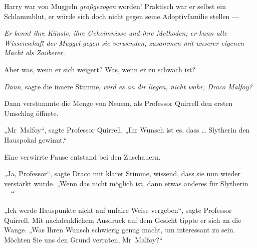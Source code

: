 Harry war von Muggeln \emph{großgezogen} worden! Praktisch war er selbst ein Schlammblut, er würde sich doch nicht gegen seine Adoptivfamilie stellen —

\emph{Er kennt ihre Künste, ihre Geheimnisse und ihre Methoden; er kann alle Wissenschaft der Muggel gegen sie verwenden, zusammen mit unserer eigenen Macht als Zauberer.}

Aber was, wenn er sich weigert? Was, wenn er zu schwach ist?

\emph{Dann}, sagte die innere Stimme, \emph{wird es an dir liegen, nicht wahr, Draco Malfoy?}

Dann verstummte die Menge von Neuem, als Professor Quirrell den ersten Umschlag öffnete.

„Mr~Malfoy“, sagte Professor Quirrell,
„Ihr Wunsch ist es, dass … Slytherin den Hauspokal gewinnt.“

Eine verwirrte Pause entstand bei den Zuschauern.

„Ja, Professor“, sagte Draco mit klarer Stimme, wissend, dass sie nun wieder verstärkt wurde.
„Wenn das nicht möglich ist, dann etwas anderes für Slytherin —“

„Ich werde Hauspunkte nicht auf unfaire Weise vergeben“, sagte Professor Quirrell. Mit nachdenklichem Ausdruck auf dem Gesicht tippte er sich an die Wange.
„Was Ihren Wunsch schwierig genug macht, um interessant zu sein. Möchten Sie uns den Grund verraten, Mr~Malfoy?“

